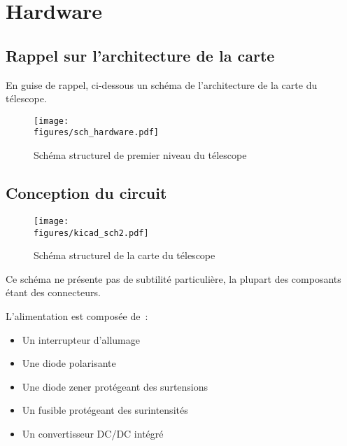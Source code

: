 \chapter{Hardware}

\section{Rappel sur l'architecture de la carte}

En guise de rappel, ci-dessous un schéma de l'architecture de la carte du télescope.

\begin{figure}[H]
    \centering
    \texttt{[image: \\figures/sch\_hardware.pdf]}
    \decoRule
    \caption[
    Schéma structurel de premier niveau du télescope]{
    Schéma structurel de premier niveau du télescope}
    \label{fig:Schéma structurel de premier niveau du télescope}
    \end{figure}

\section{Conception du circuit}

\begin{figure}[H]
    \centering
    \texttt{[image: \\figures/kicad\_sch2.pdf]}
    \decoRule
    \caption[
    Schéma structurel de la carte du télescope]{
    Schéma structurel de la carte du télescope}
    \label{fig:Schéma structurel de la carte du télescope}
    \end{figure}

\vspace{1cm}

Ce schéma ne présente pas de subtilité particulière, la plupart des composants étant des connecteurs.

\vspace{1cm}

L'alimentation est composée de~:
\begin{itemize}[label=$\bullet$]
	\item Un interrupteur d'allumage
	\item Une diode polarisante
	\item Une diode zener protégeant des surtensions
	\item Un fusible protégeant des surintensités
	\item Un convertisseur DC/DC intégré
	\end{itemize}


